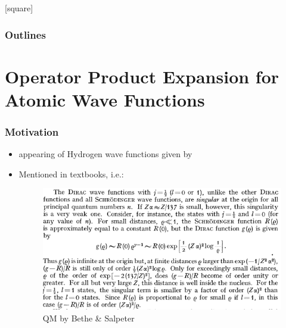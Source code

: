 [square]



\begin{frame}{}
  \maketitle
\end{frame}

\begin{frame}
  \frametitle{Outlines}
  \tableofcontents
\end{frame}


\section{Operator Product Expansion for Atomic Wave Functions}
\begin{frame}
	\frametitle{Motivation}

	\begin{itemize}
		\item {} appearing  of Hydrogen wave functions given by 
		\item Mentioned in textbooks, i.e.:
		\begin{figure}[!htb]
			\centering
			\includegraphics[width=\linewidth]{bethe-salpeter-QM-DiracDiv.png}
			\caption{QM by Bethe \& Salpeter}
			\label{fig:bethe-salpeter-QM-DiracDiv}
		\end{figure}
		
	\end{itemize}

\end{frame}
